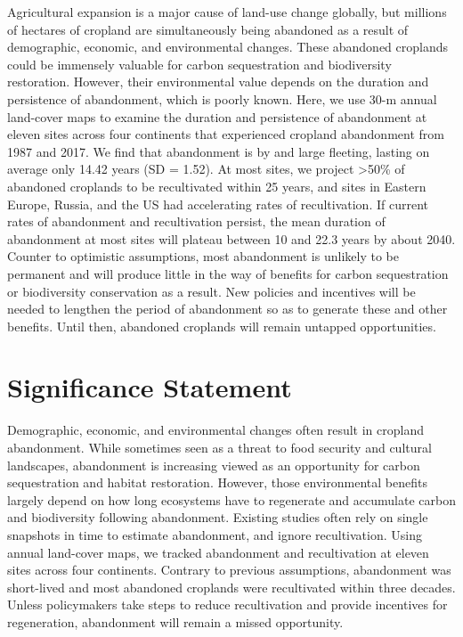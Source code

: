 \documentclass[9pt,twocolumn,twoside,]{pnas-new}
\begin{document}
Agricultural expansion is a major cause of land-use change globally, but
millions of hectares of cropland are simultaneously being abandoned as a
result of demographic, economic, and environmental changes. These
abandoned croplands could be immensely valuable for carbon sequestration
and biodiversity restoration. However, their environmental value depends
on the duration and persistence of abandonment, which is poorly known.
Here, we use 30-m annual land-cover maps to examine the duration and
persistence of abandonment at eleven sites across four continents that
experienced cropland abandonment from 1987 and 2017. We find that
abandonment is by and large fleeting, lasting on average only 14.42
years (SD = 1.52). At most sites, we project \textgreater50\% of
abandoned croplands to be recultivated within 25 years, and sites in
Eastern Europe, Russia, and the US had accelerating rates of
recultivation. If current rates of abandonment and recultivation
persist, the mean duration of abandonment at most sites will plateau
between 10 and 22.3 years by about 2040. Counter to optimistic
assumptions, most abandonment is unlikely to be permanent and will
produce little in the way of benefits for carbon sequestration or
biodiversity conservation as a result. New policies and incentives will
be needed to lengthen the period of abandonment so as to generate these
and other benefits. Until then, abandoned croplands will remain untapped
opportunities.

\hypertarget{significance-statement}{%
\section{Significance Statement}\label{significance-statement}}

Demographic, economic, and environmental changes often result in
cropland abandonment. While sometimes seen as a threat to food security
and cultural landscapes, abandonment is increasing viewed as an
opportunity for carbon sequestration and habitat restoration. However,
those environmental benefits largely depend on how long ecosystems have
to regenerate and accumulate carbon and biodiversity following
abandonment. Existing studies often rely on single snapshots in time to
estimate abandonment, and ignore recultivation. Using annual land-cover
maps, we tracked abandonment and recultivation at eleven sites across
four continents. Contrary to previous assumptions, abandonment was
short-lived and most abandoned croplands were recultivated within three
decades. Unless policymakers take steps to reduce recultivation and
provide incentives for regeneration, abandonment will remain a missed
opportunity.
\end{document}
